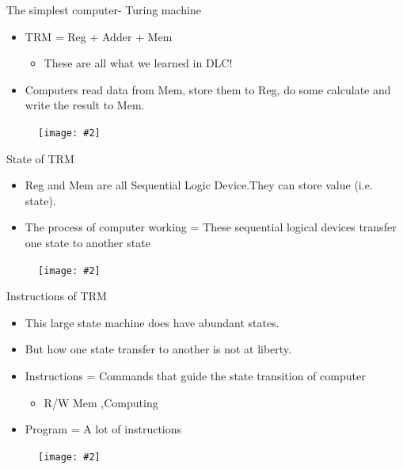 \documentclass{beamer}
\newcommand{\fignocaption}[2]{
	\begin{figure}[htp]
		\centering
		\texttt{[image: \#2]}
	\end{figure}
}
\begin{document}
\begin{frame}{The simplest computer- Turing machine}
	\begin{itemize}
		\item TRM = Reg + Adder + Mem
		\begin{itemize}
			\item These are all what we learned in DLC!
		\end{itemize}
		\item Computers read data from Mem, store them to Reg, do some calculate and write the result to Mem.
	\end{itemize}
	\fignocaption{scale=0.5}{trm.png}
\end{frame}

\begin{frame}{State of TRM}
	\begin{itemize}
		\item Reg and Mem are all Sequential Logic Device.They can store value (i.e. state).
		\item The process of computer working = These sequential logical devices  \alert{transfer one state to another state}
	\end{itemize}
	\fignocaption{scale=0.3}{stateTRM.png}
\end{frame}

\begin{frame}{Instructions of TRM}
	\begin{itemize}
		\item This large state machine does have abundant states.
		\item But how one state transfer to another is not at liberty.
		\item \alert{Instructions = Commands that guide the state transition of computer}
		\begin{itemize}
			\item R/W Mem ,Computing
		\end{itemize}
		\item \alert{Program = A lot of instructions}
	\end{itemize}
\fignocaption{scale=0.4}{stateTRM2.png}
\end{frame}
\end{document}

